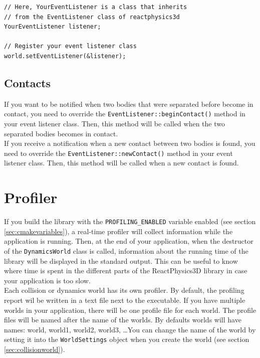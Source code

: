 \documentclass[a4paper,12pt]{article}
\begin{document}
    \begin{lstlisting}
// Here, YourEventListener is a class that inherits
// from the EventListener class of reactphysics3d
YourEventListener listener;

// Register your event listener class
world.setEventListener(&listener);
  \end{lstlisting}

    \subsection{Contacts}

   If you want to be notified when two bodies that were separated before become in contact, you need to override the \texttt{EventListener::beginContact()} method in your event
   listener class. Then, this method will be called when the two separated bodies becomes in contact. \\

   If you receive a notification when a new contact between two bodies is found, you need to override the \texttt{EventListener::newContact()} method in your event listener class. Then, this
   method will be called when a new contact is found.

    \section{Profiler}
    \label{sec:profiler}

    If you build the library with the \texttt{PROFILING\_ENABLED} variable enabled (see section \ref{sec:cmakevariables}), a real-time profiler will collect information while the application
    is running. Then, at the end of your application, when the destructor of the \texttt{DynamicsWorld} class is called, information about the running time of the library will be displayed in the
    standard output. This can be useful to know where time is spent in the different parts of the ReactPhysics3D library in case your application is too slow. \\

    Each collision or dynamics world has its own profiler. By default, the profiling report wil be written in a text file next to the executable.
    If you have multiple worlds in your application, there will be one profile file for each world. The profile files will be named after the
    name of the worlds. By defaults worlds will have names: world, world1, world2, world3, \dots You can change the name of the world by
    setting it into the \texttt{WorldSettings} object when you create the world (see section \ref{sec:collisionworld}). \\
\end{document}
